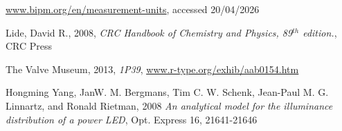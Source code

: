 \documentclass{article}[12pt]
\newcommand{\uhref}[2]{\href{#1}{\underline{#2}}} %
\begin{document}
\begin{enumerate}[label={[\arabic*]}]
            \uhref{https://www.bipm.org/en/measurement-units}{www.bipm.org/en/measurement-units}, accessed 20/04/2026
            \item \label{reference:workFunction} Lide, David R., 2008, \emph{CRC Handbook of Chemistry and Physics, 89$^{th}$ edition.}, CRC Press
            \item \label{reference:1P39PhotoelectricTube} The Valve Museum, 2013, \emph{1P39}, \uhref{https://www.r-type.org/exhib/aab0154.htm}{www.r-type.org/exhib/aab0154.htm}
            \item \label{reference:LEDLambertianEmitter} Hongming Yang, JanW. M. Bergmans, Tim C. W. Schenk, Jean-Paul M. G. Linnartz, and Ronald Rietman, 2008 \emph{An analytical model for the illuminance distribution of a power LED}, Opt. Express 16, 21641-21646
        \end{enumerate}
\end{document}
